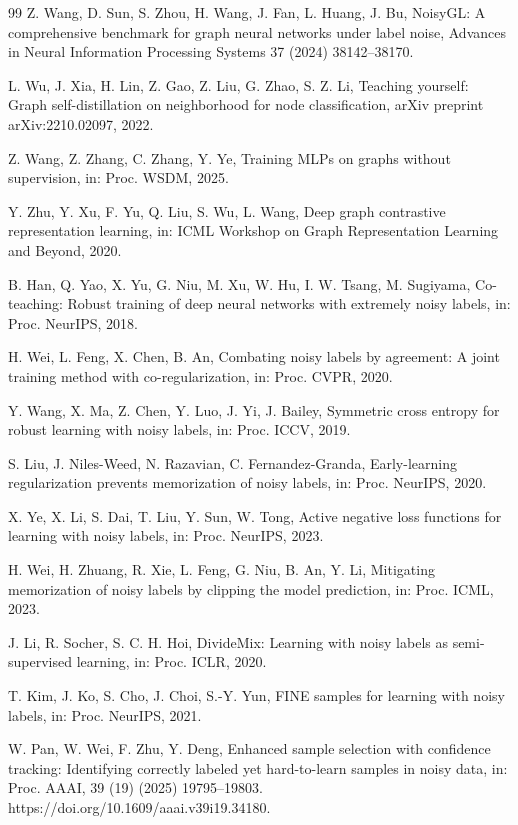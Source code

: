 \begin{thebibliography}{99}
Z. Wang, D. Sun, S. Zhou, H. Wang, J. Fan, L. Huang, J. Bu, NoisyGL: A comprehensive benchmark for graph neural networks under label noise, Advances in Neural Information Processing Systems 37 (2024) 38142--38170.

L. Wu, J. Xia, H. Lin, Z. Gao, Z. Liu, G. Zhao, S. Z. Li, Teaching yourself: Graph self-distillation on neighborhood for node classification, arXiv preprint arXiv:2210.02097, 2022.

Z. Wang, Z. Zhang, C. Zhang, Y. Ye, Training MLPs on graphs without supervision, in: Proc. WSDM, 2025.

Y. Zhu, Y. Xu, F. Yu, Q. Liu, S. Wu, L. Wang, Deep graph contrastive representation learning, in: ICML Workshop on Graph Representation Learning and Beyond, 2020.

B. Han, Q. Yao, X. Yu, G. Niu, M. Xu, W. Hu, I. W. Tsang, M. Sugiyama, Co-teaching: Robust training of deep neural networks with extremely noisy labels, in: Proc. NeurIPS, 2018.

H. Wei, L. Feng, X. Chen, B. An, Combating noisy labels by agreement: A joint training method with co-regularization, in: Proc. CVPR, 2020.

Y. Wang, X. Ma, Z. Chen, Y. Luo, J. Yi, J. Bailey, Symmetric cross entropy for robust learning with noisy labels, in: Proc. ICCV, 2019.

S. Liu, J. Niles-Weed, N. Razavian, C. Fernandez-Granda, Early-learning regularization prevents memorization of noisy labels, in: Proc. NeurIPS, 2020.

X. Ye, X. Li, S. Dai, T. Liu, Y. Sun, W. Tong, Active negative loss functions for learning with noisy labels, in: Proc. NeurIPS, 2023.

H. Wei, H. Zhuang, R. Xie, L. Feng, G. Niu, B. An, Y. Li, Mitigating memorization of noisy labels by clipping the model prediction, in: Proc. ICML, 2023.

J. Li, R. Socher, S. C. H. Hoi, DivideMix: Learning with noisy labels as semi-supervised learning, in: Proc. ICLR, 2020.

T. Kim, J. Ko, S. Cho, J. Choi, S.-Y. Yun, FINE samples for learning with noisy labels, in: Proc. NeurIPS, 2021.

W. Pan, W. Wei, F. Zhu, Y. Deng, Enhanced sample selection with confidence tracking: Identifying correctly labeled yet hard-to-learn samples in noisy data, in: Proc. AAAI, 39 (19) (2025) 19795--19803. https://doi.org/10.1609/aaai.v39i19.34180.


\end{thebibliography}
